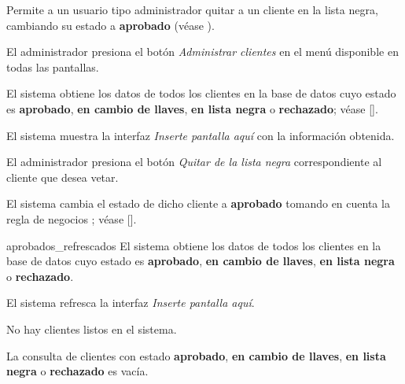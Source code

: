 %
%

{
  Permite a un usuario tipo administrador quitar a un cliente en la lista negra,
  cambiando su estado a \textbf{aprobado} (véase
  ).

  \begin{trayectoriaPrincipal}

    \item El administrador presiona el botón \textit{Administrar clientes}
      en el menú disponible en todas las pantallas.

    \item El sistema obtiene los datos de todos los clientes en la base de datos
      cuyo estado es \textbf{aprobado}, \textbf{en cambio de llaves},
      \textbf{en lista negra} o \textbf{rechazado}; véase
      [].

    \item El sistema muestra la interfaz \textit{Inserte pantalla aquí} con la
      información obtenida.

    \item El administrador presiona el botón \textit{Quitar de la lista negra}
      correspondiente al cliente que desea vetar.

    \item El sistema cambia el estado de dicho cliente a \textbf{aprobado}
      tomando en cuenta la regla de negocios ;
      véase [].

    \item [aprobados_refrescados] El sistema obtiene los datos de todos los
      clientes en la base de datos cuyo estado es \textbf{aprobado},
      \textbf{en cambio de llaves}, \textbf{en lista negra} o
      \textbf{rechazado}.

    \item El sistema refresca la interfaz \textit{Inserte pantalla aquí}.

  \end{trayectoriaPrincipal}

  \begin{trayectoriaAlternativa}
    {No hay clientes listos en el sistema.}

    \item La consulta de clientes con estado \textbf{aprobado},
    \textbf{en cambio de llaves}, \textbf{en lista negra} o \textbf{rechazado}
    es vacía.


\end{trayectoriaAlternativa}}
